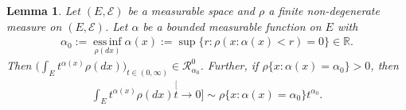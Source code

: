 \documentclass[12pt,a4paper]{amsart}
\newtheorem{lem}[thm]{Lemma}
\theoremstyle{definition}
\numberwithin{equation}{section}
\begin{document}
\begin{lem}\label{lem:regularly_variation_and_integration}
  Let $(E, \mathscr E)$ be a measurable space and $\rho$ a finite non-degenerate measure on $(E, \mathscr E)$.
  Let $\alpha$ be a bounded measurable function on $E$ with 
  \begin{align}
    \alpha_0
    := \operatorname*{ess\,inf}_{\rho(dx)} \alpha(x)
    := \sup\{r:\rho(x:\alpha(x) < r) = 0\} \in \mathbb R.
  \end{align}
	Then $\big(\int_E t^{\alpha(x)} \rho(dx)\big)_{t\in (0,\infty)} \in \mathcal R^0_{\alpha_0}$.
	Further, if $\rho \{x:\alpha(x) = \alpha_0\}>0$, then
\begin{align}
	\int_E t^{\alpha(x)} \rho(dx)
	\stackrel[t\to 0]{}{\sim}  \rho\{x:\alpha(x) = \alpha_0\} t^{\alpha_0}.
\end{align}
\end{lem}
\end{document}
